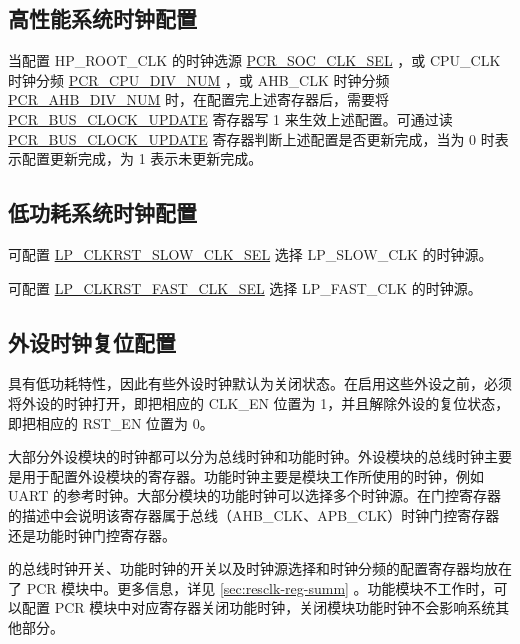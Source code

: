 \documentclass[main\_\_CN.tex]{subfiles}
\begin{document}
\subsection{高性能系统时钟配置}


当配置 HP\_ROOT\_CLK 的时钟选源 \hyperref[fielddesc:PCRSOCCLKSEL]{PCR\_SOC\_CLK\_SEL} ，或 CPU\_CLK 时钟分频 \hyperref[fielddesc:PCRCPUDIVNUM]{PCR\_CPU\_DIV\_NUM} ，或 AHB\_CLK 时钟分频 \hyperref[fielddesc:PCRAHBDIVNUM]{PCR\_AHB\_DIV\_NUM} 时，在配置完上述寄存器后，需要将 \hyperref[fielddesc:PCRBUSCLOCKUPDATE]{PCR\_BUS\_CLOCK\_UPDATE} 寄存器写 1 来生效上述配置。可通过读 \hyperref[fielddesc:PCRBUSCLOCKUPDATE]{PCR\_BUS\_CLOCK\_UPDATE} 寄存器判断上述配置是否更新完成，当为 0 时表示配置更新完成，为 1 表示未更新完成。

\subsection{低功耗系统时钟配置}

可配置 \hyperref[fielddesc:LPCLKRSTSLOWCLKSEL]{LP\_CLKRST\_SLOW\_CLK\_SEL} 选择 LP\_SLOW\_CLK 的时钟源。

可配置 \hyperref[fielddesc:LPCLKRSTFASTCLKSEL]{LP\_CLKRST\_FAST\_CLK\_SEL} 选择 LP\_FAST\_CLK 的时钟源。

\subsection{外设时钟复位配置}\label{sec:resclk-periperal-clock-configuration}

\begin{importantlisting}
\vspace{-0.5em}

\chipname{} 具有低功耗特性，因此有些外设时钟默认为关闭状态。在启用这些外设之前，必须将外设的时钟打开，即把相应的 CLK\_EN 位置为 1，并且解除外设的复位状态，即把相应的 RST\_EN 位置为 0。
\end{importantlisting}

大部分外设模块的时钟都可以分为总线时钟和功能时钟。外设模块的总线时钟主要是用于配置外设模块的寄存器。功能时钟主要是模块工作所使用的时钟，例如 UART 的参考时钟。大部分模块的功能时钟可以选择多个时钟源。在门控寄存器的描述中会说明该寄存器属于总线（AHB\_CLK、APB\_CLK）时钟门控寄存器还是功能时钟门控寄存器。

\chipname{} 的总线时钟开关、功能时钟的开关以及时钟源选择和时钟分频的配置寄存器均放在了 PCR 模块中。更多信息，详见 \ref{sec:resclk-reg-summ} \textit{}。功能模块不工作时，可以配置 PCR 模块中对应寄存器关闭功能时钟，关闭模块功能时钟不会影响系统其他部分。
\end{document}
